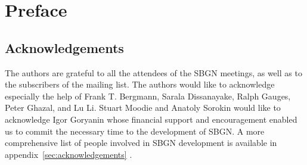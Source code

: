 
\chapter{Preface}

\section*{Acknowledgements}

The authors are grateful to all the attendees of the SBGN meetings, as well as to the subscribers of the  mailing list.
The authors would like to acknowledge especially the help of Frank T. Bergmann, Sarala Dissanayake, Ralph Gauges, Peter Ghazal, and Lu Li.
Stuart Moodie and Anatoly Sorokin would like to acknowledge Igor Goryanin whose financial support and encouragement enabled us to commit the necessary time to the development of SBGN.
A more comprehensive list of people involved in SBGN development is available in appendix~\ref{sec:acknowledgements} .


